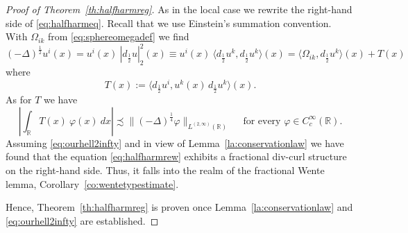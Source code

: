 \documentclass[12pt]{amsart}
\theoremstyle{definition}
\newcommand{\R}{\mathbb{R}}
\numberwithin{theorem}{section} \numberwithin{equation}{section}
\newcommand{\lap}{\Delta }
\newcommand{\aleq}{\precsim}
\newcommand{\lapv}{(-\lap)^{\frac{1}{4}}}
\newcommand{\laph}{(-\lap)^{\frac{1}{2}}}
\begin{document}
\begin{proof}[Proof of Theorem~\ref{th:halfharmreg}]As in the local case we rewrite the right-hand side of \eqref{eq:halfharmeq}. Recall that we use Einstein's summation convention. With $\Omega_{ik}$ from \eqref{eq:sphereomegadef} we find
\begin{equation}\label{eq:halfharmrew}
 \laph u^i(x) = u^i(x)\ |d_{\frac{1}{2}} u|_2^2(x) \equiv  u^i(x)\  \langle d_{\frac{1}{2}} u^k , d_{\frac{1}{2}}u^k \rangle (x)=
  \langle \Omega_{ik}, d_{\frac{1}{2}}u^k \rangle(x) + T(x)
\end{equation}
where 
\[
 T(x) := \langle d_{\frac{1}{2}} u^i, u^k(x)\, d_{\frac{1}{2}}u^k \rangle (x).
\]
As for $T$ we have
\begin{equation}\label{eq:ourhell2infty}
 \left |\int_{\R} T(x)\ \varphi(x)\ dx \right | \aleq \|\lapv \varphi\|_{L^{(2,\infty)}(\R)} \quad\text{ for every }\varphi\in C^\infty_c(\R).
\end{equation}
Assuming \eqref{eq:ourhell2infty} and in view of Lemma~\ref{la:conservationlaw} we have found that the equation \eqref{eq:halfharmrew} exhibits a fractional div-curl structure on the right-hand side. Thus, it falls into the realm of the fractional Wente lemma, Corollary~\ref{co:wentetypestimate}. 

Hence, Theorem~\ref{th:halfharmreg} is proven once Lemma~\ref{la:conservationlaw} and \eqref{eq:ourhell2infty} are established.
% 
\end{proof}
\end{document}
